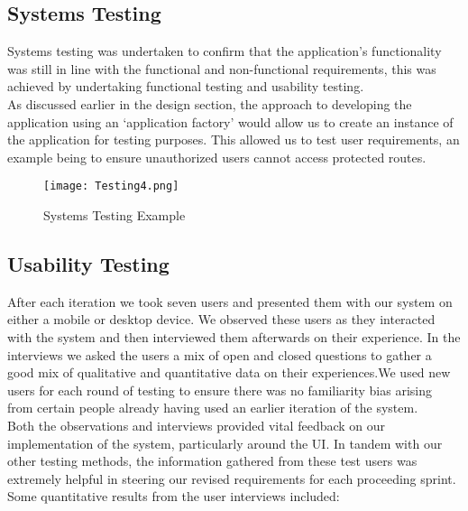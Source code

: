 \documentclass[11pt, english]{article}
\begin{document}
	\subsection{Systems Testing}

	Systems testing was undertaken to confirm that the application's functionality was still in line with the functional and non-functional requirements, this was achieved by undertaking functional testing and usability testing.\\

	As discussed earlier in the design section, the approach to developing the application using an `application factory' would allow us to create an instance of the application for testing purposes. This allowed us to test user requirements, an example being to ensure unauthorized users cannot access protected routes.

	\begin{figure}[H]
	\begin{center}
		\texttt{[image: Testing4.png]}
		\caption{Systems Testing Example}
	\end{center}
	\end{figure}

	\subsection{Usability Testing}

	After each iteration we took seven users and presented them with our system on either a mobile or desktop device. We observed these users as they interacted with the system and then interviewed them afterwards on their experience. In the interviews we asked the users a mix of open and closed questions to gather a good mix of qualitative and quantitative data on their experiences.We used new users for each round of testing to ensure there was no familiarity bias arising from certain people already having used an earlier iteration of the system.\\

	Both the observations and interviews provided vital feedback on our implementation of the system, particularly around the UI. In tandem with our other testing methods, the information gathered from these test users was extremely helpful in steering our revised requirements for each proceeding sprint.\\

	Some quantitative results from the user interviews included:
\end{document}
